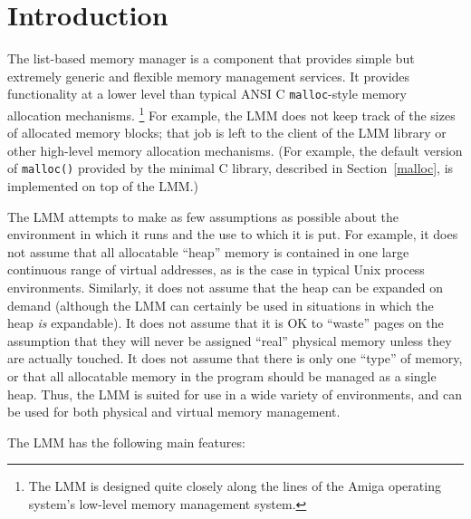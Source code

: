 %
% 
%
\label{lmm}

\section{Introduction}

The list-based memory manager is a component that
provides simple but extremely generic and flexible memory management services.
It provides functionality at a lower level
than typical ANSI C {\tt malloc}-style memory allocation mechanisms.%
\footnote{%
	The LMM is designed quite closely along the lines
	of the Amiga operating system's low-level memory management system.
}
For example, the LMM does not keep track
of the sizes of allocated memory blocks;
that job is left to the client of the LMM library
or other high-level memory allocation mechanisms.
(For example,
the default version of {\tt malloc()} provided by the minimal C library,
described in Section~\ref{malloc},
is implemented on top of the LMM.)

The LMM attempts to make as few assumptions as possible
about the environment in which it runs and the use to which it is put.
For example, it does not assume
that all allocatable ``heap'' memory is contained
in one large continuous range of virtual addresses,
as is the case in typical Unix process environments.
Similarly, it does not assume that the heap can be expanded on demand
(although the LMM can certainly be used in situations
in which the heap \emph{is} expandable).
It does not assume that it is OK to ``waste'' pages
on the assumption that they will never be assigned ``real'' physical memory
unless they are actually touched.
It does not assume that there is only one ``type'' of memory,
or that all allocatable memory in the program
should be managed as a single heap.
Thus, the LMM is suited for use in a wide variety of environments,
and can be used for both physical and virtual memory management.

The LMM has the following main features:


